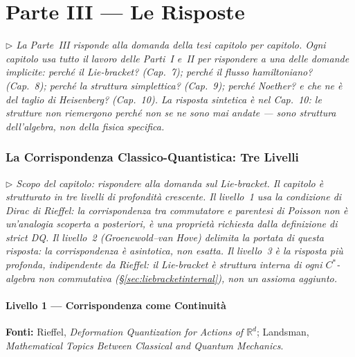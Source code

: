 \documentclass[12pt, a4paper]{article}
\newcommand{\fonti}[1]{%
	\begin{fontebox}
		\textcolor{fontecolor}{\footnotesize\textbf{Fonti:} #1}
	\end{fontebox}%
}
\newcommand{\nota}[1]{%
	\par\smallskip
	\noindent\textit{\small $\triangleright$\; #1}
	\par\smallskip
}
\begin{document}
	\newpage
	\part*{Parte III --- Le Risposte}
	
	\nota{La Parte~III risponde alla domanda della tesi capitolo per capitolo.
		Ogni capitolo usa tutto il lavoro delle Parti~I e~II per rispondere a una delle
		domande implicite: perché il Lie-bracket? (Cap.\ 7); perché il flusso hamiltoniano?
		(Cap.\ 8); perché la struttura simplettica? (Cap.\ 9); perché Noether?
		e che ne è del taglio di Heisenberg? (Cap.\ 10). La risposta sintetica è nel
		Cap.\ 10: le strutture non riemergono perché non se ne sono mai andate --- sono
		struttura dell'algebra, non della fisica specifica.}
	
	\newpage
	\section{La Corrispondenza Classico-Quantistica: Tre Livelli}
	
	\nota{Scopo del capitolo: rispondere alla domanda sul Lie-bracket. Il capitolo è
		strutturato in tre livelli di profondità crescente. Il livello~1 usa la condizione
		di Dirac di Rieffel: la corrispondenza tra commutatore e parentesi di Poisson non
		è un'analogia scoperta a posteriori, è una proprietà richiesta dalla definizione
		di strict DQ. Il livello~2 (Groenewold--van Hove) delimita la portata di questa
		risposta: la corrispondenza è asintotica, non esatta. Il livello~3 è la risposta
		più profonda, indipendente da Rieffel: il Lie-bracket è struttura interna di ogni
		$C^*$-algebra non commutativa (§\ref{sec:liebracketinternal}), non un assioma aggiunto.}
	
	\subsection{Livello 1 --- Corrispondenza come Continuità}
	
	\fonti{Rieffel, \textit{Deformation Quantization for Actions of $\mathbb{R}^d$};
		Landsman, \textit{Mathematical Topics Between Classical and Quantum Mechanics}.}
	
\end{document}
